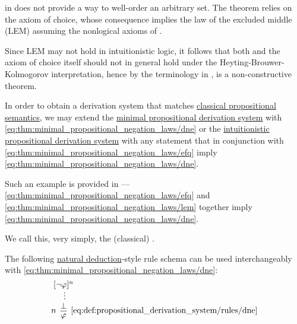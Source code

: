 \begin{example}\label{ex:def:brouwer_heyting_kolmogorov_interpretation/well_ordering_principle_zfc}
   in \hyperref[def:set]{} does not provide a way to well-order an arbitrary set. The theorem relies on the axiom of choice, whose consequence  implies the law of the excluded middle (LEM) assuming the nonlogical axioms of .

  Since LEM may not hold in intuitionistic logic, it follows that both  and the axiom of choice itself should not in general hold under the Heyting-Brouwer-Kolmogorov interpretation, hence by the terminology in ,  is a non-constructive theorem.
\end{example}

\begin{definition}\label{def:propositional_derivation_system}
  In order to obtain a derivation system that matches \hyperref[def:propositional_semantics]{classical propositional semantics}, we may extend the \hyperref[def:minimal_propositional_derivation_system]{minimal propositional derivation system} with \eqref{eq:thm:minimal_propositional_negation_laws/dne} or the \hyperref[def:intuitionistic_propositional_derivation_system]{intuitionistic propositional derivation system} with any statement that in conjunction with \eqref{eq:thm:minimal_propositional_negation_laws/efq} imply \eqref{eq:thm:minimal_propositional_negation_laws/dne}.

  Such an example is provided in  --- \eqref{eq:thm:minimal_propositional_negation_laws/efq} and \eqref{eq:thm:minimal_propositional_negation_laws/lem} together imply \eqref{eq:thm:minimal_propositional_negation_laws/dne}.

  We call this, very simply, the (classical) .

   The following \hyperref[thm:minimal_natural_deduction]{natural deduction}-style rule schema can be used interchangeably with \eqref{eq:thm:minimal_propositional_negation_laws/dne}:
  \begin{equation*}\taglabel[\textrm{R} \textrm{DNE}]{eq:def:propositional_derivation_system/rules/dne}
    \begin{prooftree}
      \hypo{ [\neg \varphi]^n }
      \ellipsis {} { \bot }
      \infer[left label=\( n \)]1[\ref{eq:def:propositional_derivation_system/rules/dne}]{ \varphi }
    \end{prooftree}
  \end{equation*}
\end{definition}

